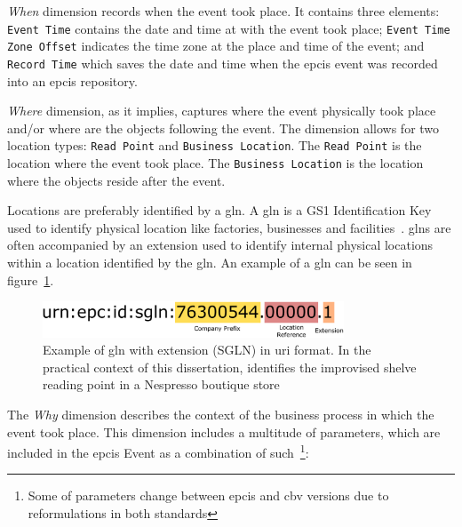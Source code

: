 \emph{When} dimension records when the event took place. It contains three elements: \texttt{Event Time} contains the date and time at with the event took place; \texttt{Event Time Zone Offset} indicates the time zone at the place and time of the event; and \texttt{Record Time} which saves the date and time when the \ac{epcis} event was recorded into an \ac{epcis} repository.

\emph{Where} dimension, as it implies, captures where the event physically took place and/or where are the objects following the event. The dimension allows for two location types: \texttt{Read Point} and \texttt{Business Location}.
The \texttt{Read Point} is the location where the event took place. The \texttt{Business Location} is the location where the objects reside after the event.

Locations are preferably identified by a \ac{gln}. A \ac{gln} is a GS1 Identification Key used to identify physical location like factories, businesses and facilities~\cite{GS1KeysImplementation}. \acp{gln} are often accompanied by an extension used to identify internal physical locations within a location identified by the \ac{gln}. An example of a \ac{gln} can be seen in figure~\ref{fig:gln}. 

\begin{figure}[]
    \centering
    \includegraphics[width=0.8\textwidth]{./figs/02-state-of-the-art/sglnexample.pdf}
    \caption[Example of \ac{gln} with extension (SGLN) in \ac{uri} format]{Example of \ac{gln} with extension (SGLN) in \ac{uri} format. In the practical context of this dissertation, identifies the improvised shelve reading point in a Nespresso boutique store} 
    \label{fig:gln}
\end{figure}

The \emph{Why} dimension describes the context of the business process in which the event took place.
This dimension includes a multitude of parameters, which are included in the \ac{epcis} Event as a combination of such~\footnote{Some of parameters change between \ac{epcis} and \ac{cbv} versions due to reformulations in both standards}:

